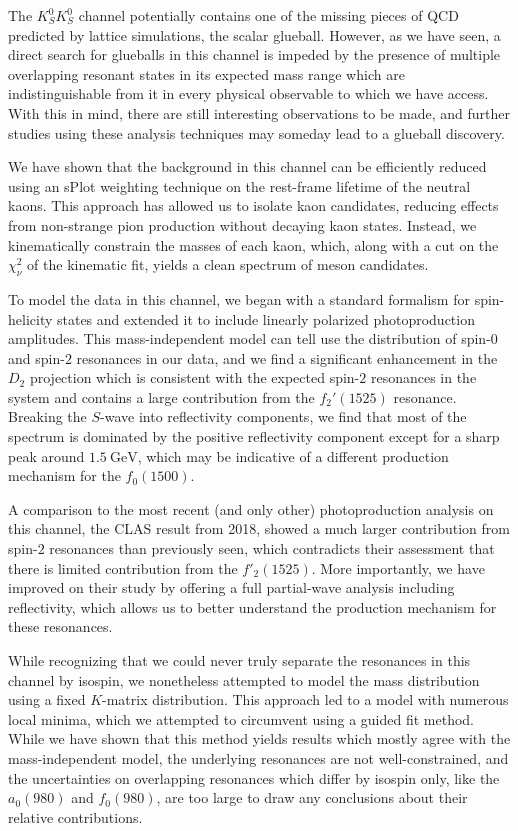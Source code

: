 The $K_S^0K_S^0$ channel potentially contains one of the missing pieces of QCD predicted by lattice simulations, the scalar glueball. However, as we have seen, a direct search for glueballs in this channel is impeded by the presence of multiple overlapping resonant states in its expected mass range which are indistinguishable from it in every physical observable to which we have access. With this in mind, there are still interesting observations to be made, and further studies using these analysis techniques may someday lead to a glueball discovery.

We have shown that the background in this channel can be efficiently reduced using an sPlot weighting technique on the rest-frame lifetime of the neutral kaons. This approach has allowed us to isolate kaon candidates, reducing effects from non-strange pion production without decaying kaon states. Instead, we kinematically constrain the masses of each kaon, which, along with a cut on the $\chi^2_\nu$ of the kinematic fit, yields a clean spectrum of meson candidates.

To model the data in this channel, we began with a standard formalism for spin-helicity states and extended it to include linearly polarized photoproduction amplitudes. This mass-independent model can tell use the distribution of spin-$0$ and spin-$2$ resonances in our data, and we find a significant enhancement in the $D_2$ projection which is consistent with the expected spin-$2$ resonances in the system and contains a large contribution from the $f_2'(1525)$ resonance. Breaking the $S$-wave into reflectivity components, we find that most of the spectrum is dominated by the positive reflectivity component except for a sharp peak around $\SI{1.5}{\giga\electronvolt}$, which may be indicative of a different production mechanism for the $f_0(1500)$.

A comparison to the most recent (and only other) photoproduction analysis on this channel, the CLAS result from 2018, showed a much larger contribution from spin-$2$ resonances than previously seen, which contradicts their assessment that there is limited contribution from the $f'_2(1525)$. More importantly, we have improved on their study by offering a full partial-wave analysis including reflectivity, which allows us to better understand the production mechanism for these resonances.

While recognizing that we could never truly separate the resonances in this channel by isospin, we nonetheless attempted to model the mass distribution using a fixed $K$-matrix distribution. This approach led to a model with numerous local minima, which we attempted to circumvent using a guided fit method. While we have shown that this method yields results which mostly agree with the mass-independent model, the underlying resonances are not well-constrained, and the uncertainties on overlapping resonances which differ by isospin only, like the $a_0(980)$ and $f_0(980)$, are too large to draw any conclusions about their relative contributions.

